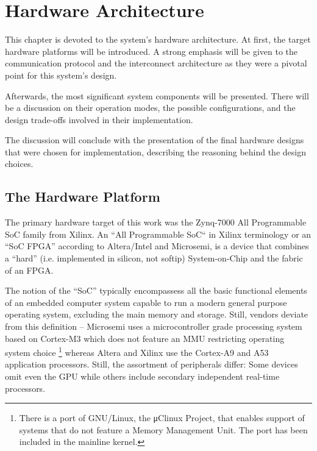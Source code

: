 \chapter{Hardware Architecture}

This chapter is devoted to the system's hardware architecture.
At first, the target hardware platforms will be introduced.
A strong emphasis will be given to the communication protocol and the interconnect architecture
as they were a pivotal point for this system's design.

Afterwards, the most significant system components will be presented.
There will be a discussion on their operation modes, 
the possible configurations, and the design trade-offs involved in their implementation.

The discussion will conclude with the presentation of the final hardware designs
that were chosen for implementation, describing the reasoning behind the
design choices.


\section{The Hardware Platform}

The primary hardware target of this work was the Zynq-7000 All Programmable SoC family from Xilinx.
An ``All Programmable SoC`` in Xilinx terminology or an ``SoC FPGA'' according to Altera/Intel and Microsemi,
is a device that combines a ``hard'' (i.e. implemented in silicon, not \gls{softip}) System-on-Chip
and the \gls{fabric} of an FPGA.

The notion of the ``SoC'' typically encompassess all the basic functional elements of
an embedded computer system capable to run a modern general purpose operating system,
excluding the main memory and storage. Still, vendors deviate from this definition --
Microsemi uses a microcontroller grade processing system based on Cortex-M3
which does not feature an MMU restricting operating system choice
\footnote{There is a port of GNU/Linux, the μClinux Project, that enables support of systems
that do not feature a Memory Management Unit. The port has been included in the mainline kernel.}
whereas Altera and Xilinx use the Cortex-A9 and A53 application processors. 
Still, the assortment of peripherals differ: 
Some devices omit even the GPU while others include secondary independent real-time processors.

